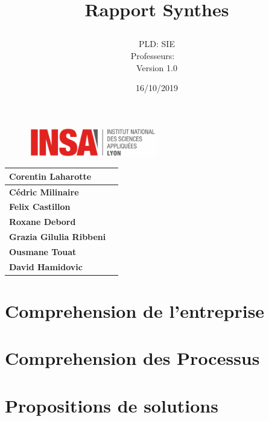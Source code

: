 \documentclass[]{scrartcl}
\title{Rapport Synthes\\
\subtitle{}
\author{PLD: SIE\\
Professeurs:\
\ \\
Version 1.0}
\date{16/10/2019}}
\begin{document}
\maketitle

\begin{figure}[h]
	\centering
  \includegraphics[width=0.5\textwidth]{img/insa-logo}
	\label{fig:logo}
\end{figure}


\begin{center}
  \begin{tabular}{ | l | r | }
    \hline
    \textbf{Corentin Laharotte}\\ \hline
    \textbf{Cédric Milinaire }\\ \hline
    \textbf{Felix Castillon}\\ \hline
    \textbf{Roxane Debord}\\ \hline
     \textbf{Grazia Gilulia Ribbeni}\\ \hline
     \textbf{Ousmane Touat} \\ \hline
     \textbf{David Hamidovic} \\ \hline


  \end{tabular}
\end{center}

\thispagestyle{empty}
\pagebreak
\vspace*{10pt}
\tableofcontents
\listoffigures
\newpage

\section{Comprehension de l'entreprise}
\section{Comprehension des Processus}
\section{Propositions de solutions}
\end{document}
